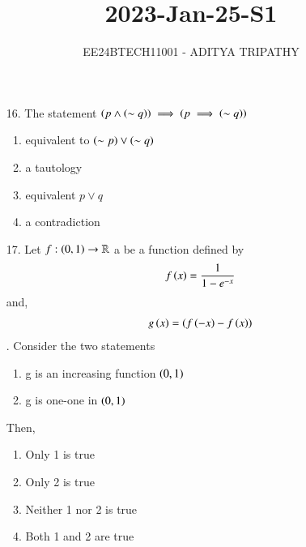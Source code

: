 \documentclass[journal,12pt,onecolumn]{IEEEtran}
\theoremstyle{remark}
\begin{document}

\vspace{3cm}

\title{2023-Jan-25-S1}
\author{EE24BTECH11001 -  ADITYA TRIPATHY}
\maketitle

\renewcommand{\thefigure}{\theenumi}
\renewcommand{\thetable}{\theenumi}

\begin{enumerate}
    \item[16.] 
        The statement $\left(p \land \left(\sim q\right)\right) \implies \left(p \implies \left(\sim q\right)\right)$
        \hfill{}
        \begin{multicols}{4}
            \begin{enumerate}
                \item equivalent to $\left(\sim p\right) \lor \left(\sim q\right)$
                    \columnbreak
                \item a tautology
                    \columnbreak
                \item equivalent $p \lor q$
                    \columnbreak
                \item a contradiction
            \end{enumerate}
        \end{multicols}

    \item[17.] Let $f : \left(0, 1\right) \rightarrow \mathbb{R}$ a be a function defined by
        \begin{align}
            f\left(x\right) = \frac{1}{1 - e^{-x}}
        \end{align} and, 
        \begin{align}
            g\left(x\right) = \left(f\left(-x\right) - f\left(x\right)\right)
        \end{align}. Consider the two statements
        \begin{enumerate}
            \item g is an increasing function $\left(0, 1\right)$
            \item g is one-one in $\left(0, 1\right)$
        \end{enumerate} Then,
        \hfill{}
        \begin{multicols}{4}
            \begin{enumerate}
                \item Only 1 is true \columnbreak
                \item Only 2 is true \columnbreak
                \item Neither 1 nor 2 is true \columnbreak
                \item Both 1 and 2 are true
            \end{enumerate}
        \end{multicols}



\end{enumerate}
\end{document}
